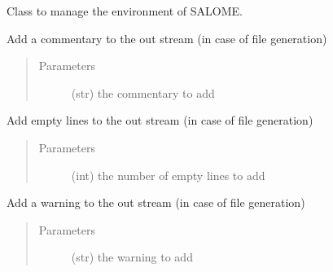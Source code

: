 \documentclass[a4paper,10pt,english]{sphinxmanual}
\begin{document}
\begin{fulllineitems}
\label{\detokenize{apidoc_src/src:src.environment.SalomeEnviron}}
Class to manage the environment of SALOME.

\begin{fulllineitems}
\label{\detokenize{apidoc_src/src:src.environment.SalomeEnviron.add_comment}}
Add a commentary to the out stream (in case of file generation)
\begin{quote}\begin{description}
\item[{Parameters}] \leavevmode
{} \textendash{} (str) the commentary to add

\end{description}\end{quote}

\end{fulllineitems}


\begin{fulllineitems}
\label{\detokenize{apidoc_src/src:src.environment.SalomeEnviron.add_line}}
Add empty lines to the out stream (in case of file generation)
\begin{quote}\begin{description}
\item[{Parameters}] \leavevmode
{} \textendash{} (int) the number of empty lines to add

\end{description}\end{quote}

\end{fulllineitems}


\begin{fulllineitems}
\label{\detokenize{apidoc_src/src:src.environment.SalomeEnviron.add_warning}}
Add a warning to the out stream (in case of file generation)
\begin{quote}\begin{description}
\item[{Parameters}] \leavevmode
{} \textendash{} (str) the warning to add


\end{description}
\end{quote}
\end{fulllineitems}
\end{fulllineitems}
\end{document}
